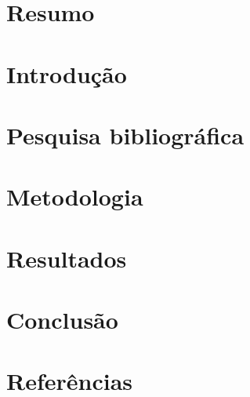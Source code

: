 \documentclass[
12pt,				%
openright,			%
oneside,			%
a4paper,			%
brazil				%
]{abntex2}
\begin{document}
	
	\imprimecapa %
	
	\section{Resumo}
	
	
	\newpage
	\section{Introdução}
	
	
	\newpage
	\section{Pesquisa bibliográfica}
	
	
	\newpage
	\section{Metodologia}
	
	
	\newpage
	\section{Resultados}
	
	
	\newpage
	\section{Conclusão}
	
	
	\newpage
	\begingroup
	\let\clearpage\relax
	\section{Referências}
	\renewcommand{\bibname}{}
	
	\endgroup
	
\end{document}
